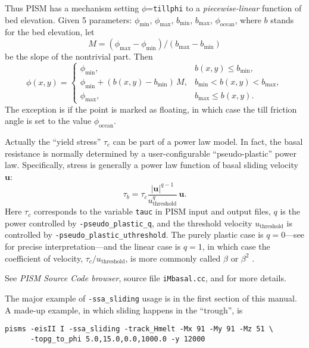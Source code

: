 Thus PISM has a mechanism setting $\phi$=\texttt{tillphi} to a \emph{piecewise-linear} function of bed elevation.  Given 5 parameters: $\phi_{\mathrm{min}}$, $\phi_{\mathrm{max}}$, $b_{\mathrm{min}}$, $b_{\mathrm{max}}$, $\phi_{\mathrm{ocean}}$, where $b$ stands for the bed elevation, let 
\begin{equation}
  M = (\phi_{\text{max}} - \phi_{\text{min}}) / (b_{\text{max}} - b_{\text{min}})\label{eq:1}
\end{equation}
be the slope of the nontrivial part.  Then
\begin{equation}
  \phi(x,y) = \begin{cases}
    \phi_{\text{min}}, & b(x,y) \le b_{\text{min}}, \\
    \phi_{\text{min}} + (b(x,y) - b_{\text{min}}) \,M,
    &  b_{\text{min}} < b(x,y) < b_{\text{max}}, \\
    \phi_{\text{max}}, & b_{\text{max}} \le b(x,y). \end{cases}\label{eq:2}
\end{equation}
The exception is if the point is marked as floating, in which case the till friction angle
is set to the value $\phi_{\mathrm{ocean}}$.

Actually the ``yield stress'' $\tau_c$ can be part of a power law model.  In fact, the basal resistance is normally determined by a user-configurable ``pseudo-plastic'' power law.  Specifically, stress is generally a power law function of basal sliding velocity $\mathbf{u}$:
   $$\tau_b = \tau_c \frac{|\mathbf{u}|^{q-1}}{u_{\text{threshold}}^q}\, \mathbf{u}.$$
Here $\tau_c$ corresponds to the variable \texttt{tauc} in PISM input and output files, $q$ is the power controlled by \texttt{-pseudo_plastic_q}, and the threshold velocity $u_{\text{threshold}}$ is controlled by \texttt{-pseudo_plastic_uthreshold}.  The purely plastic case is $q=0$---see \cite{SchoofStream} for precise interpretation---and the linear case is $q=1$, in which case the coefficient of velocity, $\tau_c/u_{\text{threshold}}$, is more commonly called $\beta$ or $\beta^2$ \cite{MacAyeal}.

See \emph{PISM Source Code browser}, source file \texttt{iMbasal.cc}, and \cite{BBssasliding,BKAJS} for more details.

The major example of \texttt{-ssa_sliding} usage is in the first section of this manual.  A made-up example, in which sliding happens in the ``trough'', is
\begin{verbatim}
pisms -eisII I -ssa_sliding -track_Hmelt -Mx 91 -My 91 -Mz 51 \
      -topg_to_phi 5.0,15.0,0.0,1000.0 -y 12000
\end{verbatim}

